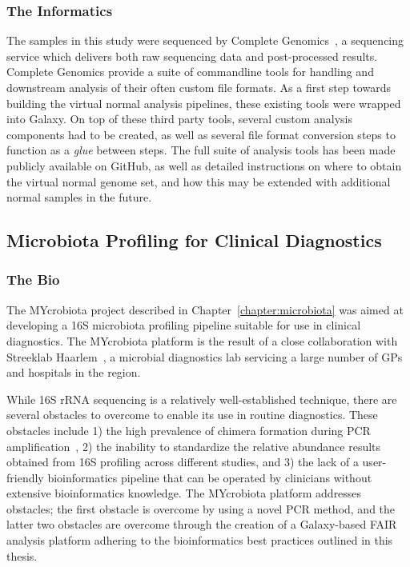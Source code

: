 \subsubsection{The Informatics}
The samples in this study were sequenced by Complete Genomics~\cite{drmanac}, a sequencing service which delivers both raw sequencing data and post-processed results. Complete Genomics provide a suite of commandline tools for handling and downstream analysis of their often custom file formats. As a first step towards building the virtual normal analysis pipelines, these existing tools were wrapped into Galaxy. On top of these third party tools, several custom analysis components had to be created, as well as several file format conversion steps to function as a \emph{glue} between steps. The full suite of analysis tools has been made publicly available on GitHub, as well as detailed instructions on where to obtain the virtual normal genome set, and how this may be extended with additional normal samples in the future.


\subsection{Microbiota Profiling for Clinical Diagnostics}
\subsubsection{The Bio}
The MYcrobiota project described in Chapter~\ref{chapter:microbiota} was aimed at developing a 16S microbiota profiling pipeline suitable for use in clinical diagnostics. The MYcrobiota platform is the result of a close collaboration with Streeklab Haarlem~\cite{url-streeklab}, a microbial diagnostics lab servicing a large number of GPs and hospitals in the region.

While 16S rRNA sequencing is a relatively well-established technique, there are several obstacles to overcome to enable its use in routine diagnostics. These obstacles include 1) the high prevalence of chimera formation during PCR amplification~\cite{huttenhower2012structure}, 2) the inability to standardize the relative abundance results obtained from 16S profiling across different studies, and 3) the lack of a user-friendly bioinformatics pipeline that can be operated by clinicians without extensive bioinformatics knowledge. The MYcrobiota platform addresses obstacles; the first obstacle is overcome by using a novel PCR method, and the latter two obstacles are overcome through the creation of a Galaxy-based FAIR analysis platform adhering to the bioinformatics best practices outlined in this thesis.

